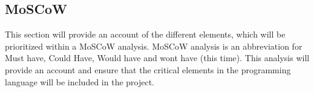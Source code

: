 \subsection{MoSCoW}


This section will provide an account of the different elements, which will be prioritized within a MoSCoW analysis. MoSCoW analysis is an abbreviation for Must have, Could Have, Would have and wont have (this time). This analysis will provide an account and ensure that the critical elements in the programming language will be included in the project.


